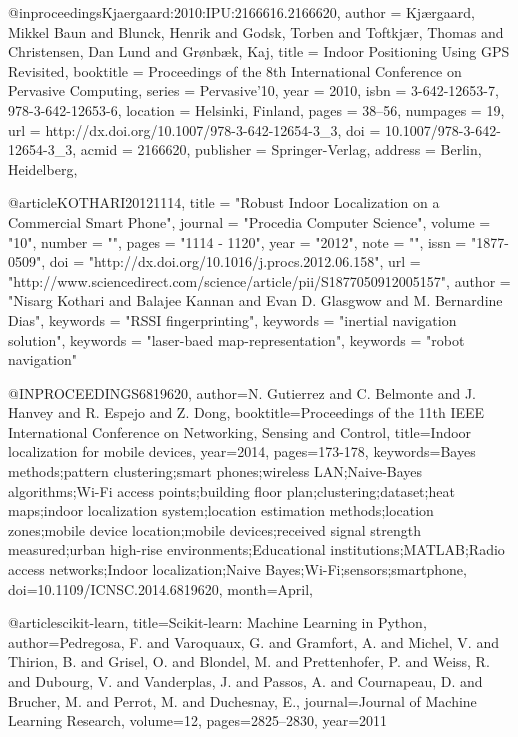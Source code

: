 @inproceedings{Kjaergaard:2010:IPU:2166616.2166620,
 author = {Kj{\ae}rgaard, Mikkel Baun and Blunck, Henrik and Godsk, Torben and Toftkj{\ae}r, Thomas and Christensen, Dan Lund and Gr{\o}nb{\ae}k, Kaj},
 title = {Indoor Positioning Using GPS Revisited},
 booktitle = {Proceedings of the 8th International Conference on Pervasive Computing},
 series = {Pervasive'10},
 year = {2010},
 isbn = {3-642-12653-7, 978-3-642-12653-6},
 location = {Helsinki, Finland},
 pages = {38--56},
 numpages = {19},
 url = {http://dx.doi.org/10.1007/978-3-642-12654-3_3},
 doi = {10.1007/978-3-642-12654-3_3},
 acmid = {2166620},
 publisher = {Springer-Verlag},
 address = {Berlin, Heidelberg},
}

@article{KOTHARI20121114,
title = "Robust Indoor Localization on a Commercial Smart Phone",
journal = "Procedia Computer Science",
volume = "10",
number = "",
pages = "1114 - 1120",
year = "2012",
note = "",
issn = "1877-0509",
doi = "http://dx.doi.org/10.1016/j.procs.2012.06.158",
url = "http://www.sciencedirect.com/science/article/pii/S1877050912005157",
author = "Nisarg Kothari and Balajee Kannan and Evan D. Glasgwow and M. Bernardine Dias",
keywords = "RSSI fingerprinting",
keywords = "inertial navigation solution",
keywords = "laser-baed map-representation",
keywords = "robot navigation"
}

@INPROCEEDINGS{6819620,
author={N. Gutierrez and C. Belmonte and J. Hanvey and R. Espejo and Z. Dong},
booktitle={Proceedings of the 11th IEEE International Conference on Networking, Sensing and Control},
title={Indoor localization for mobile devices},
year={2014},
pages={173-178},
keywords={Bayes methods;pattern clustering;smart phones;wireless LAN;Naive-Bayes algorithms;Wi-Fi access points;building floor plan;clustering;dataset;heat maps;indoor localization system;location estimation methods;location zones;mobile device location;mobile devices;received signal strength measured;urban high-rise environments;Educational institutions;MATLAB;Radio access networks;Indoor localization;Naive Bayes;Wi-Fi;sensors;smartphone},
doi={10.1109/ICNSC.2014.6819620},
month={April},}

@article{scikit-learn,
 title={Scikit-learn: Machine Learning in {P}ython},
 author={Pedregosa, F. and Varoquaux, G. and Gramfort, A. and Michel, V.
         and Thirion, B. and Grisel, O. and Blondel, M. and Prettenhofer, P.
         and Weiss, R. and Dubourg, V. and Vanderplas, J. and Passos, A. and
         Cournapeau, D. and Brucher, M. and Perrot, M. and Duchesnay, E.},
 journal={Journal of Machine Learning Research},
 volume={12},
 pages={2825--2830},
 year={2011}
}
